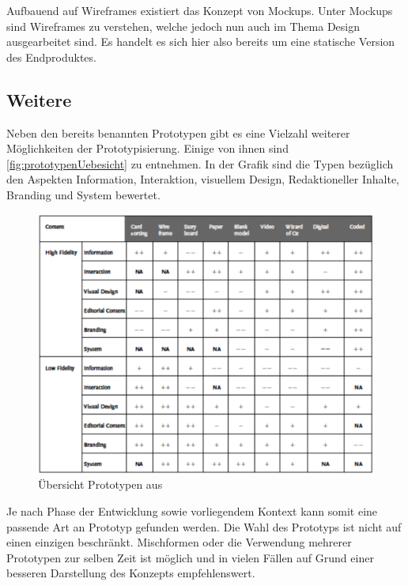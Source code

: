 Aufbauend auf Wireframes existiert das Konzept von Mockups.
Unter Mockups sind Wireframes zu verstehen, welche jedoch nun auch im Thema Design ausgearbeitet sind.
Es handelt es sich hier also bereits um eine statische Version des Endproduktes.

\subsection{Weitere}

Neben den bereits benannten Prototypen gibt es eine Vielzahl weiterer Möglichkeiten der Prototypisierung.
Einige von ihnen sind \autoref{fig:prototypenUebesicht} zu entnehmen.
In der Grafik sind die Typen bezüglich den Aspekten Information, Interaktion, visuellem Design, Redaktioneller Inhalte, Branding und System bewertet.

\begin{figure}[htp]
    \centering
    \includegraphics[width=\textwidth]{images/prototypen-Ã¼bersicht.png}
    \caption{Übersicht Prototypen aus \cite{NOG}}
    \label{fig:prototypenUebesicht}
\end{figure}

Je nach Phase der Entwicklung sowie vorliegendem Kontext kann somit eine passende Art an Prototyp gefunden werden.
Die Wahl des Prototyps ist nicht auf einen einzigen beschränkt.
Mischformen oder die Verwendung mehrerer Prototypen zur selben Zeit ist möglich und in vielen Fällen auf Grund einer besseren Darstellung des Konzepts empfehlenswert.